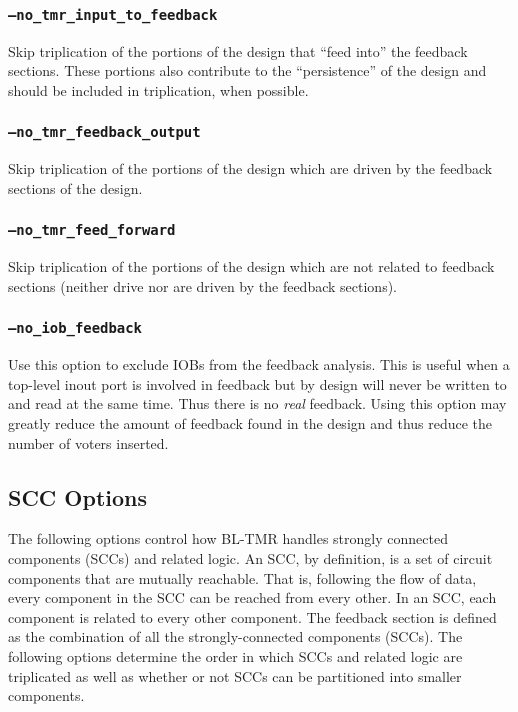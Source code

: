 \subsubsection{\texttt{--no\_tmr\_input\_to\_feedback}}
Skip triplication of the portions of the design that ``feed into'' the feedback 
sections. These portions also contribute to the ``persistence'' of the design 
and should be included in triplication, when possible.

\subsubsection{\texttt{--no\_tmr\_feedback\_output}}
Skip triplication of the portions of the design which are driven by the 
feedback sections of the design.

\subsubsection{\texttt{--no\_tmr\_feed\_forward}}
Skip triplication of the portions of the design which are not related to 
feedback sections (neither drive nor are driven by the feedback sections).

\subsubsection{\texttt{--no\_iob\_feedback}}
Use this option to exclude IOBs from the feedback analysis. This is useful when
a top-level inout port is involved in feedback but by design will never be 
written to and read at the same time. Thus there is no \emph{real} feedback.
Using this option may greatly reduce the amount of feedback found in the design
and thus reduce the number of voters inserted.

\subsection{SCC Options}
The following options control how BL-TMR handles strongly connected components 
(SCCs) and related logic. An SCC, by definition, is a set of circuit components 
that are mutually reachable. That is, following the flow of data, every 
component in the SCC can be reached from every other. In an SCC, each component 
is related to every other component. The feedback section is defined as the 
combination of all the strongly-connected components (SCCs). The following 
options determine the order in which SCCs and related logic are triplicated as 
well as whether or not SCCs can be partitioned into smaller components.


